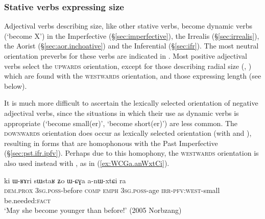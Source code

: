 \subsubsection{Stative verbs expressing size} \label{sec:preverb.adjectives.size}
Adjectival verbs describing size, like other stative verbs, become dynamic verbs (`become X') in the Imperfective (§\ref{sec:imperfective}), the Irrealis (§\ref{sec:irrealis}), the Aorist (§\ref{sec:aor.inchoative}) and the Inferential (§\ref{sec:ifr}). The most neutral orientation preverbs for these verbs are indicated in . Most positive adjectival verbs select the \textsc{upwards} orientation, except for those describing radial size (, ) which are  found with the \textsc{westwards} orientation, and those expressing length (see below).

It is much more difficult to ascertain the lexically selected orientation of negative adjectival verbs, since the situations in which their use as dynamic verbs is appropriate (`become small(er)', `become short(er)') are less common. The \textsc{downwards} orientation does occur as lexically selected orientation (with   and ), resulting in forms that are homophonous with the Past Imperfective (§\ref{sec:pst.ifr.ipfv}). Perhaps due to this homophony, the \textsc{westwards} orientation is also used instead with , as in (\ref{ex:WCGa.anWxtCi}).

\begin{exe}
\ex \label{ex:WCGa.anWxtCi}
\gll ki ɯ-ʁɤri sɯstaʁ ʑo ɯ-ɕɣa a-nɯ-xtɕi ra \\
\textsc{dem}.\textsc{prox} \textsc{3sg}.\textsc{poss}-before \textsc{comp} \textsc{emph} \textsc{3sg}.\textsc{poss}-age \textsc{irr}-\textsc{pfv}:\textsc{west}-small be.needed:\textsc{fact} \\
\glt `May she become younger than before!' (2005 Norbzang)
\end{exe}

